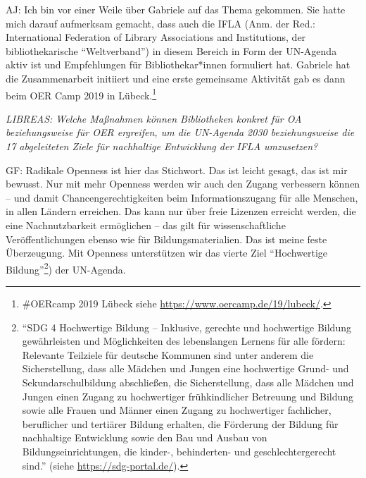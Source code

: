 \documentclass[a4paper,
fontsize=11pt,
oneside,
numbers=noperiodatend,
parskip=half-,
bibliography=totoc,
final
]{scrartcl}
\begin{document}
AJ: Ich bin vor einer Weile über Gabriele auf das Thema gekommen. Sie
hatte mich darauf aufmerksam gemacht, dass auch die IFLA (Anm. der Red.:
International Federation of Library Associations and Institutions, der
bibliothekarische \enquote{Weltverband}) in diesem Bereich in Form der
UN-Agenda aktiv ist und Empfehlungen für Bibliothekar*innen formuliert
hat. Gabriele hat die Zusammenarbeit initiiert und eine erste gemeinsame
Aktivität gab es dann beim OER Camp 2019 in Lübeck.\footnote{\#OERcamp
  2019 Lübeck siehe \url{https://www.oercamp.de/19/lubeck/}.}

\emph{LIBREAS: Welche Maßnahmen können Bibliotheken konkret für OA
beziehungsweise für OER ergreifen, um die UN-Agenda 2030 beziehungsweise
die 17 abgeleiteten Ziele für nachhaltige Entwicklung der IFLA
umzusetzen?}

GF: Radikale Openness ist hier das Stichwort. Das ist leicht gesagt, das
ist mir bewusst. Nur mit mehr Openness werden wir auch den Zugang
verbessern können -- und damit Chancengerechtigkeiten beim
Informationszugang für alle Menschen, in allen Ländern erreichen. Das
kann nur über freie Lizenzen erreicht werden, die eine Nachnutzbarkeit
ermöglichen -- das gilt für wissenschaftliche Veröffentlichungen ebenso
wie für Bildungsmaterialien. Das ist meine feste Überzeugung. Mit
Openness unterstützen wir das vierte Ziel \enquote{Hochwertige
Bildung}\footnote{\enquote{SDG 4 Hochwertige Bildung -- Inklusive,
  gerechte und hochwertige Bildung gewährleisten und Möglichkeiten des
  lebenslangen Lernens für alle fördern: Relevante Teilziele für
  deutsche Kommunen sind unter anderem die Sicherstellung, dass alle
  Mädchen und Jungen eine hochwertige Grund- und Sekundarschulbildung
  abschließen, die Sicherstellung, dass alle Mädchen und Jungen einen
  Zugang zu hochwertiger frühkindlicher Betreuung und Bildung sowie alle
  Frauen und Männer einen Zugang zu hochwertiger fachlicher, beruflicher
  und tertiärer Bildung erhalten, die Förderung der Bildung für
  nachhaltige Entwicklung sowie den Bau und Ausbau von
  Bildungseinrichtungen, die kinder-, behinderten- und
  geschlechtergerecht sind.} (siehe \url{https://sdg-portal.de/}).}) der
UN-Agenda.
\end{document}
